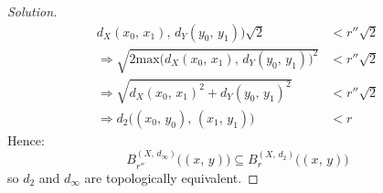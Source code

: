 \documentclass{article}
\theoremstyle{normal}
\begin{document}
\begin{proof}[Solution]
\begin{subequations}
\begin{align}
                    d_{X}(x_{0},\,x_{1}),\,d_{Y}(y_{0},\,y_{1})
                \big)\sqrt{2}&<r''\sqrt{2}\\
                \Rightarrow
                \sqrt{2\textrm{max}\big(%
                    d_{X}(x_{0},\,x_{1}),\,d_{Y}(y_{0},\,y_{1})
                \big)^{2}}&<r''\sqrt{2}\\
                \Rightarrow
                \sqrt{d_{X}(x_{0},\,x_{1})^{2}+d_{Y}(y_{0},\,y_{1})^{2}}
                &<r''\sqrt{2}\\
                \Rightarrow
                d_{2}\big((x_{0},\,y_{0}),\,(x_{1},\,y_{1})\big)&<r
            \end{align}
        \end{subequations}
        Hence:
        \begin{equation}
            B_{r''}^{(X,\,d_{\infty})}\big((x,\,y)\big)\subseteq
                B_{r}^{(X,\,d_{2})}\big((x,\,y)\big)
        \end{equation}
        so $d_{2}$ and $d_{\infty}$ are topologically equivalent.
    \end{proof}
\end{document}
